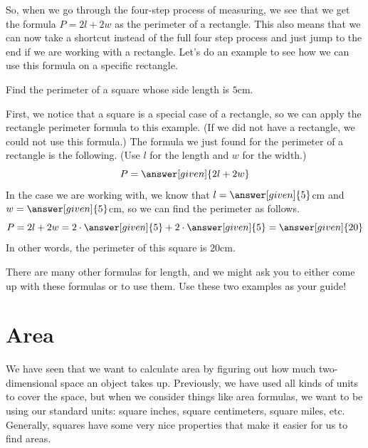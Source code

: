 \documentclass{ximera}
\begin{document}
So, when we go through the four-step process of measuring, we see that we get the formula $P = 2l +2w$ as the perimeter of a rectangle. This also means that we can now take a shortcut instead of the full four step process and just jump to the end if we are working with a rectangle. Let's do an example to see how we can use this formula on a specific rectangle.

\begin{question}
Find the perimeter of a square whose side length is $5$cm.
\begin{explanation}
First, we notice that a square is a special case of a rectangle, so we can apply the rectangle perimeter formula to this example. (If we did not have a rectangle, we could not use this formula.) The formula we just found for the perimeter of a rectangle is the following. (Use $l$ for the length and $w$ for the width.)
\[
P = \answer[given]{2l+2w}
\]
In the case we are working with, we know that $l = \answer[given]{5}$cm and $w = \answer[given]{5}$cm, so we can find the perimeter as follows.
\[
P = 2l + 2w = 2\cdot \answer[given]{5} + 2\cdot \answer[given]{5} = \answer[given]{20}
\]
In other words, the perimeter of this square is $20$cm.
\end{explanation}
\end{question}

There are many other formulas for length, and we might ask you to either come up with these formulas or to use them. Use these two examples as your guide!


\section{Area}

We have seen that we want to calculate area by figuring out how much two-dimensional space an object takes up. Previously, we have used all kinds of units to cover the space, but when we consider things like area formulas, we want to be using our standard units: square inches, square centimeters, square miles, etc. Generally, squares have some very nice properties that make it easier for us to find areas.
\end{document}
